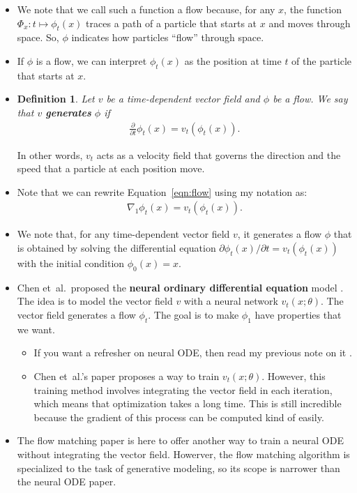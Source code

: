 \documentclass[10pt]{article}
\newtheorem{definition}[lemma]{Definition}
\newcommand{\etal}{{et~al.}}
\begin{document}
\begin{itemize}
  \item We note that we call such a function a flow because, for any $x$, the function $\Phi_{x}: t \mapsto \phi_t(x)$ traces a path of a particle that starts at $x$ and moves through space. So, $\phi$ indicates how particles ``flow'' through space. 
  
  \item If $\phi$ is a flow, we can interpret $\phi_t(x)$ as the position at time $t$ of the particle that starts at $x$.
  
  \item \begin{definition}
    Let $v$ be a time-dependent vector field and $\phi$ be a flow. We say that $v$ {\bf generates} $\phi$ if
    \begin{align}
      \frac{\partial}{\partial t} \phi_t(x) = v_t(\phi_t(x)). \label{eqn:flow}
    \end{align}
  \end{definition}
  In other words, $v_t$ acts as a velocity field that governs the direction and the speed that a particle at each position move.

  \item Note that we can rewrite Equation~\eqref{eqn:flow} using my notation \cite{Khungurn:Notation} as:
  \begin{align}
    \nabla_1 \phi_t(x) = v_t(\phi_t(x)). \label{eqn:flow-my-notation}
  \end{align}

  \item We note that, for any time-dependent vector field $v$, it generates a flow $\phi$ that is obtained by solving the differential equation $\partial \phi_t(x) / \partial t = v_t(\phi_t(x))$ with the initial condition $\phi_0(x) = x$.

  \item Chen \etal\ proposed the {\bf neural ordinary differential equation} model \cite{Chen:2019}. The idea is to model the vector field $v$ with a neural network $v_t(x;\theta)$. The vector field generates a flow $\phi_t$. The goal is to make $\phi_1$ have properties that we want.
  \begin{itemize}        
    \item If you want a refresher on neural ODE, then read my previous note on it \cite{Khungurn:neuralODE}.    
    \item Chen \etal's paper proposes a way to train $v_t(x;\theta)$. However, this training method involves integrating the vector field in each iteration, which means that optimization takes a long time. This is still incredible because the gradient of this process can be computed kind of easily.
  \end{itemize}

  \item The flow matching paper is here to offer another way to train a neural ODE without integrating the vector field. Howerver, the flow matching algorithm is specialized to the task of generative modeling, so its scope is narrower than the neural ODE paper.
\end{itemize}
\end{document}
